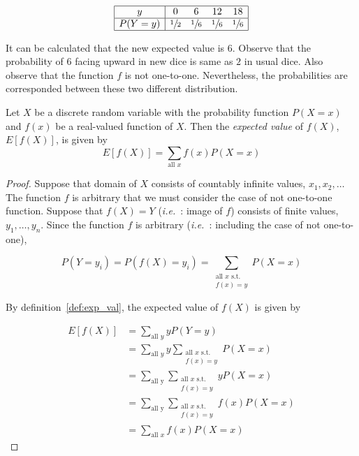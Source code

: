\[\begin{array}{|c|cccc|}
    \hline
    y           & 0 & 6 & 12 & 18\\
    \hline 
    P(Y = y)    & \sfrac{1}{2} & \sfrac{1}{6} & \sfrac{1}{6} & \sfrac{1}{6} \\
    \hline
\end{array}\]

It can be calculated that the new expected value is $6$. 
Observe that the probability of $6$ facing upward in new dice is same as $2$ in usual dice.
Also observe that the function $f$ is not one-to-one.
Nevertheless, the probabilities are corresponded between these two different distribution.

\begin{theorem}
    Let $X$ be a discrete random variable with the probability function $P(X = x)$ and $f(x)$ be a real-valued function of $X$. 
    Then the \emph{expected value} of $f(X)$, $E[f(X)]$, is given by
    \[
        E[f(X)] = \sum_{\text{all } x}{f(x)P(X = x)}
    \]
\end{theorem}

\begin{proof}
    Suppose that domain of $X$ consists of countably infinite values, $x_1, x_2,  \ldots$
    The function $f$ is arbitrary that we must consider the case of not one-to-one function.
    Suppose that $f(X) = Y$ (\emph{i.e.~}: image of $f$) consists of finite values, $y_1, \ldots, y_n$.
    Since the function $f$ is arbitrary (\emph{i.e.~}: including the case of not one-to-one),

    \[P(Y = y_i) = P(f(X) = y_i) = 
        \sum_{\substack {
            \text{all $x$ s.t.} \\
            f(x) = y}} 
        P(X = x)
    \]

    By definition~\ref{def:exp_val}, the expected value of $f(X)$ is given by

    \begin{align*}
        E[f(X)] &= \sum_{\text{all } y}{yP(Y = y)} \\
            &=  \sum_{\text{all } y}
                {y \sum_{\substack {
                        \text{all $x$ s.t.} \\
                        f(x) = y}}  
                    P(X = x)} \\
            &= \sum_{\text{all y}}
                {\sum_{\substack {
                        \text{all $x$ s.t.} \\
                        f(x) = y}} 
                    yP(X = x)} \\
            &= \sum_{\text{all y}}
                    {\sum_{\substack {
                            \text{all $x$ s.t.} \\
                            f(x) = y}} 
                        f(x)P(X = x)} \\
            &= \sum_{\text{all $x$}} f(x)P(X = x)
    \end{align*}
\end{proof}

